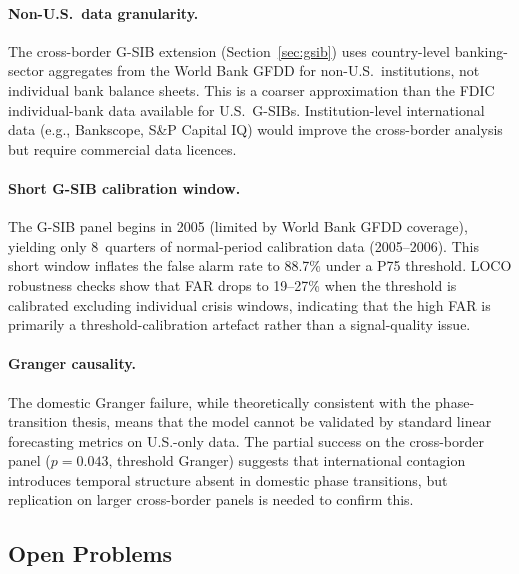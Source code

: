 \documentclass[11pt]{article}
\theoremstyle{definition}
\begin{document}
\paragraph{Non-U.S.\ data granularity.}
The cross-border G-SIB extension (Section~\ref{sec:gsib}) uses country-level
banking-sector aggregates from the World Bank GFDD for non-U.S.\ institutions,
not individual bank balance sheets.  This is a coarser approximation than the
FDIC individual-bank data available for U.S.\ G-SIBs.  Institution-level
international data (e.g., Bankscope, S\&P Capital IQ) would improve the
cross-border analysis but require commercial data licences.

\paragraph{Short G-SIB calibration window.}
The G-SIB panel begins in 2005 (limited by World Bank GFDD coverage), yielding
only 8~quarters of normal-period calibration data (2005--2006).  This short window
inflates the false alarm rate to 88.7\% under a P75 threshold.  LOCO robustness
checks show that FAR drops to 19--27\% when the threshold is calibrated excluding
individual crisis windows, indicating that the high FAR is primarily a
threshold-calibration artefact rather than a signal-quality issue.

\paragraph{Granger causality.}
The domestic Granger failure, while theoretically consistent with the
phase-transition thesis, means that the model cannot be validated by standard
linear forecasting metrics on U.S.-only data.  The partial success on the
cross-border panel ($p = 0.043$, threshold Granger) suggests that international
contagion introduces temporal structure absent in domestic phase transitions,
but replication on larger cross-border panels is needed to confirm this.

\subsection{Open Problems}
\end{document}
